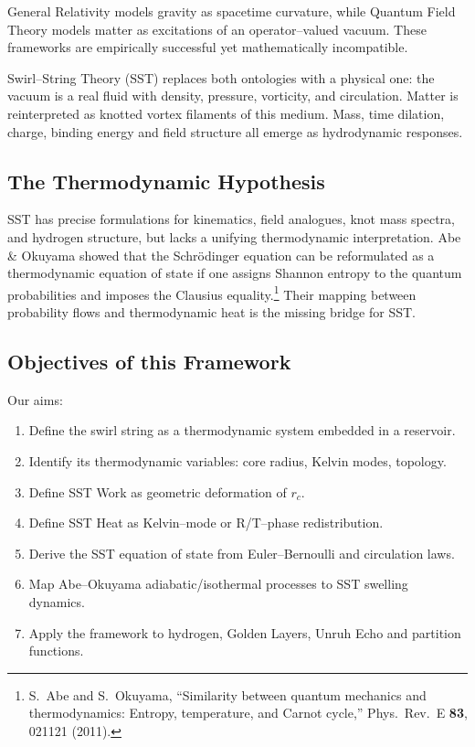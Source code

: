 \documentclass[11pt]{article}
\newcommand{\rc}{r_c}                                    %
\begin{document}
            General Relativity models gravity as spacetime curvature, while Quantum Field
            Theory models matter as excitations of an operator--valued vacuum. These
            frameworks are empirically successful yet mathematically incompatible.

            Swirl--String Theory (SST) replaces both ontologies with a physical one: the
            vacuum is a real fluid with density, pressure, vorticity, and circulation. Matter
            is reinterpreted as knotted vortex filaments of this medium. Mass, time dilation,
            charge, binding energy and field structure all emerge as hydrodynamic responses.

        \subsection{The Thermodynamic Hypothesis}

            SST has precise formulations for kinematics, field analogues, knot mass spectra,
            and hydrogen structure, but lacks a unifying thermodynamic interpretation.
            Abe \& Okuyama showed that the Schrödinger equation can be reformulated as a
            thermodynamic equation of state if one assigns Shannon entropy to the quantum
            probabilities and imposes the Clausius equality.\footnote{S.~Abe and S.~Okuyama,
        ``Similarity between quantum mechanics and thermodynamics: Entropy, temperature,
        and Carnot cycle,'' Phys.\ Rev.\ E \textbf{83}, 021121 (2011).}
            Their mapping between probability flows and thermodynamic heat is the missing
            bridge for SST.

        \subsection{Objectives of this Framework}

            Our aims:
            \begin{enumerate}
                \item Define the swirl string as a thermodynamic system embedded in a reservoir.
                \item Identify its thermodynamic variables: core radius, Kelvin modes, topology.
                \item Define SST Work as geometric deformation of $\rc$.
                \item Define SST Heat as Kelvin--mode or R/T--phase redistribution.
                \item Derive the SST equation of state from Euler--Bernoulli and circulation laws.
                \item Map Abe--Okuyama adiabatic/isothermal processes to SST swelling dynamics.
                \item Apply the framework to hydrogen, Golden Layers, Unruh Echo and partition
                functions.
            \end{enumerate}
\end{document}
